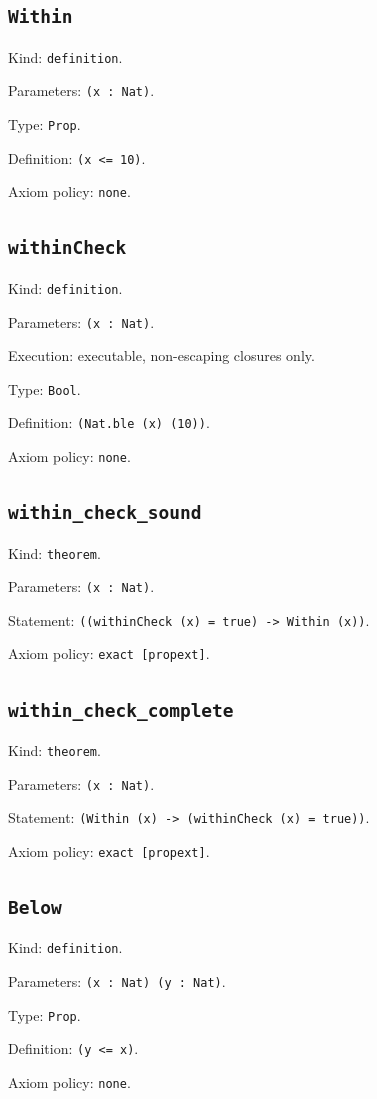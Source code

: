 \documentclass[11pt]{article}
\begin{document}
\subsection*{\texttt{Within}}
\noindent Kind: \texttt{definition}.\par
\noindent Parameters: \texttt{(x : Nat)}.\par
\noindent Type: \texttt{Prop}.\par
\noindent Definition: \texttt{(x <= 10)}.\par
\noindent Axiom policy: \texttt{none}.\par
\subsection*{\texttt{withinCheck}}
\noindent Kind: \texttt{definition}.\par
\noindent Parameters: \texttt{(x : Nat)}.\par
\noindent Execution: executable, non-escaping closures only.\par
\noindent Type: \texttt{Bool}.\par
\noindent Definition: \texttt{(Nat.ble (x) (10))}.\par
\noindent Axiom policy: \texttt{none}.\par
\subsection*{\texttt{within\_check\_sound}}
\noindent Kind: \texttt{theorem}.\par
\noindent Parameters: \texttt{(x : Nat)}.\par
\noindent Statement: \texttt{((withinCheck (x) = true) -> Within (x))}.\par
\noindent Axiom policy: \texttt{exact [propext]}.\par
\subsection*{\texttt{within\_check\_complete}}
\noindent Kind: \texttt{theorem}.\par
\noindent Parameters: \texttt{(x : Nat)}.\par
\noindent Statement: \texttt{(Within (x) -> (withinCheck (x) = true))}.\par
\noindent Axiom policy: \texttt{exact [propext]}.\par
\subsection*{\texttt{Below}}
\noindent Kind: \texttt{definition}.\par
\noindent Parameters: \texttt{(x : Nat) (y : Nat)}.\par
\noindent Type: \texttt{Prop}.\par
\noindent Definition: \texttt{(y <= x)}.\par
\noindent Axiom policy: \texttt{none}.\par
\end{document}
